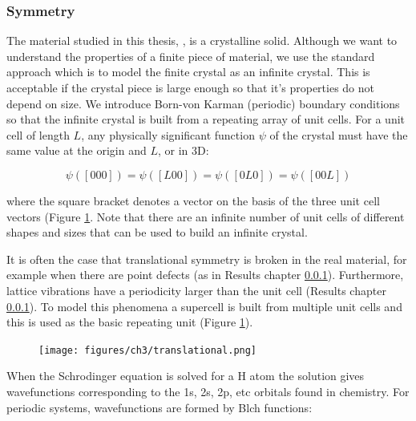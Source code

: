 
\subsubsection{Symmetry}

The material studied in this thesis, , is a crystalline solid. Although we want to understand the properties of a finite piece of material, we use the standard approach which is to model the finite crystal as an infinite crystal. This is acceptable if the crystal piece is large enough so that it's properties do not depend on size. We introduce Born-von Karman (periodic) boundary conditions so that the infinite crystal is built from a repeating array of unit cells. For a unit cell of length $L$, any physically significant function $\psi$ of the crystal must have the same value at the origin and $L$, or in 3D:

$$ 
\psi([0 0 0]) = \psi([L 0 0]) =  \psi([ 0 L 0]) = \psi([0 0 L])
$$

where the square bracket denotes a vector on the basis of the three unit cell vectors (Figure \ref{translational}. Note that there are an infinite number of unit cells of different shapes and sizes that can be used to build an infinite crystal.

It is often the case that translational symmetry is broken in the real material, for example when there are point defects (as in Results chapter \ref{}). Furthermore, lattice vibrations have a periodicity larger than the unit cell (Results chapter \ref{}). To model this phenomena a supercell is built from multiple unit cells and this is used as the basic repeating unit (Figure \ref{translational}).

\begin{figure}[h]
\centering
  \texttt{[image: figures/ch3/translational.png]}
  \caption[]{} 
  \label{translational}
\end{figure}


When the Schrodinger equation is solved for a H atom the solution gives wavefunctions corresponding to the 1s, 2s, 2p, etc orbitals found in chemistry. For periodic systems, wavefunctions are formed by Blch functions:\autocite{Hoffman1987}

